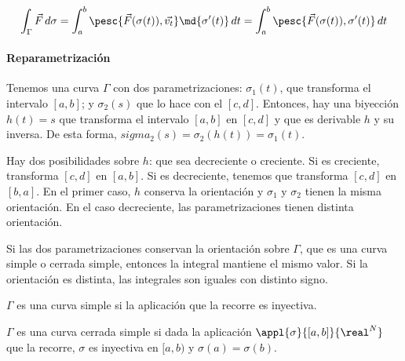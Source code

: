 \documentclass[nochap]{apuntes}
\begin{document}
\[ \int_\Gamma \vec{F} \,d\sigma = \int_a^b \pesc{\vec{F}(\sigma(t)), \vec{v_t}} \md{\sigma'(t)}\,dt = \int_a^b \pesc{\vec{F}(\sigma(t)), \sigma'(t)} \,dt \]

\paragraph{Reparametrización}

Tenemos una curva $\Gamma$ con dos parametrizaciones: $\sigma_1(t)$, que transforma el intervalo $[a,b]$; y $\sigma_2(s)$ que lo hace con el $[c,d]$. Entonces, hay una biyección $h(t) = s$ que transforma el intervalo $[a,b]$ en $[c,d]$ y que es derivable $h$ y su inversa. De esta forma, $sigma_2(s) = \sigma_2(h(t)) = \sigma_1(t)$.

Hay dos posibilidades sobre $h$: que sea decreciente o creciente. Si es creciente, transforma $[c,d]$ en $[a,b]$. Si es decreciente, tenemos que transforma $[c,d]$ en $[b,a]$. En el primer caso, $h$ conserva la orientación y $\sigma_1$ y $\sigma_2$ tienen la misma orientación. En el caso decreciente, las parametrizaciones tienen distinta orientación.

\begin{theorem}
Si las dos parametrizaciones conservan la orientación sobre $\Gamma$, que es una curva simple o cerrada simple, entonces la integral mantiene el mismo valor. Si la orientación es distinta, las integrales son iguales con distinto signo.
\end{theorem}

\begin{defn}
$\Gamma$ es una curva simple si la aplicación que la recorre es inyectiva.
\end{defn}

\begin{defn}
$\Gamma$ es una curva cerrada simple si dada la aplicación $\appl{\sigma}{[a,b]}{\real^N}$ que la recorre, $\sigma$ es inyectiva en $[a,b)$ y $\sigma(a) = \sigma(b)$.
\end{defn}
\end{document}
